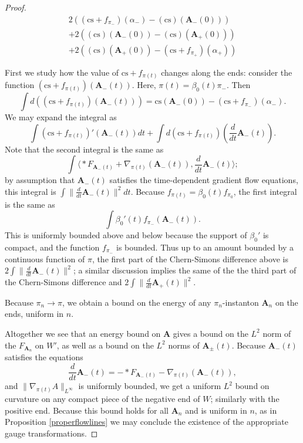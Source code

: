 \documentclass{memo-l}
\theoremstyle{definition}
\theoremstyle{remark}
\numberwithin{section}{chapter}
\numberwithin{equation}{chapter}
\begin{document}
\begin{proof}
\begin{align*}2\left((\text{cs}+f_{\pi_-})(\alpha_-) - (\text{cs})(\mathbf{A}_-(0))\right)\\
+ 2\left((\text{cs})(\mathbf{A}_-(0)) - (\text{cs})(\mathbf{A}_+(0))\right)\\
+ 2\left((\text{cs})(\mathbf{A}_+(0)) - (\text{cs}+f_{\pi_+})(\alpha_+)\right)\end{align*}

First we study how the value of $\text{cs}+f_{\pi(t)}$ changes along the ends: consider the function $(\text{cs}+f_{\pi(t)})(\mathbf{A}_-(t))$. Here, $\pi(t) = \beta_0(t) \pi_-$. Then 
$$\int d\left((\text{cs}+f_{\pi(t)})(\mathbf{A}_-(t))\right) = \text{cs}(\mathbf{A}_-(0)) - (\text{cs}+f_{\pi_-})(\alpha_-).$$
We may expand the integral as 
$$\int (\text{cs}+f_{\pi(t)})'(\mathbf{A}_-(t)) dt + \int d(\text{cs}+f_{\pi(t)})\left(\frac{d}{dt} \mathbf{A}_-(t)\right).$$ 
Note that the second integral is the same as 
$$\int \big\langle *F_{\mathbf{A}_-(t)} + \nabla_{\pi(t)}(\mathbf{A}_-(t)), \frac{d}{dt} \mathbf{A}_-(t)\big\rangle;$$ 
by assumption that $\mathbf{A}_-(t)$ satisfies the time-dependent gradient flow equations, this integral is $\int \|\frac{d}{dt} \mathbf{A}_-(t)\|^2 dt$. Because $f_{\pi(t)} = \beta_0(t) f_{\pi_0}$, the first integral is the same as 
$$\int \beta_0'(t) f_{\pi_-}(\mathbf{A}_-(t)).$$ 
This is uniformly bounded above and below because the support of $\beta_0'$ is compact, and the function $f_{\pi_-}$ is bounded. Thus up to an amount bounded by a continuous function of $\pi$, the first part of the Chern-Simons difference above is $2\int \|\frac{d}{dt} \mathbf{A}_-(t)\|^2$; a similar discussion implies the same of the the third part of the Chern-Simons difference and $2\int \|\frac{d}{dt} \mathbf{A}_+(t)\|^2$.

Because $\pi_n \to \pi$, we obtain a bound on the energy of any $\pi_n$-instanton $\mathbf{A}_n$ on the ends, uniform in $n$. 

Altogether we see that an energy bound on $\mathbf{A}$ gives a bound on the $L^2$ norm of the $F_{\mathbf{A}_n}$ on $W'$, as well as a bound on the $L^2$ norms of $\mathbf{A}_\pm(t)$. Because $\mathbf{A}_-(t)$ satisfies the equations 
$$\frac{d}{dt} \mathbf{A}_-(t) = -*F_{\mathbf{A}_-(t)} - \nabla_{\pi(t)}(\mathbf{A}_-(t)),$$ 
and $\|\nabla_{\pi(t)} A\|_{L^\infty}$ is uniformly bounded, we get a uniform $L^2$ bound on curvature on any compact piece of the negative end of $W$; similarly with the positive end. Because this bound holds for all $\mathbf{A}_n$ and is uniform in $n$, as in Proposition \ref{properflowlines} we may conclude the existence of the appropriate gauge transformations. 


\end{proof}
\end{document}
